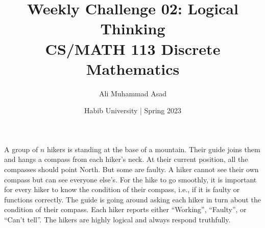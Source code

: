 \documentclass[a4paper]{exam}
\title{Weekly Challenge 02: Logical Thinking\\CS/MATH 113 Discrete Mathematics}
\author{Ali Muhammad Asad}  %
\date{Habib University | Spring 2023}
\begin{document}
\maketitle

\begin{questions}
  
  A group of $n$ hikers is standing at the base of a mountain. Their guide joins them and hangs a compass from each hiker's neck. At their current position, all the compasses should point North. But some are faulty. A hiker cannot see their own compass but can see everyone else's. For the hike to go smoothly, it is important for every hiker to know the condition of their compass, i.e., if it is faulty or functions correctly. The guide is going around asking each hiker in turn about the condition of their compass. Each hiker reports either ``Working'', ``Faulty'', or ``Can't tell''. The hikers are highly logical and always respond truthfully.


  \begin{solution}
  \end{solution}
\end{questions}
\end{document}
